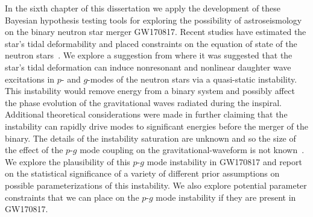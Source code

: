 In the sixth chapter of this dissertation we apply the development of these Bayesian hypothesis testing tools for exploring the possibility of astroseismology on the binary neutron star merger GW170817. Recent studies have estimated the star's tidal deformability and placed constraints on the equation of state of the neutron stars~\citep{TheLIGOScientific:2017qsa,Tews:2018iwm,Most:2018eaw,Raithel:2018ncd,de2018tidal,Abbott:2018exr,Abbott:2018wiz,Radice:2018ozg,LIGOScientific:2019eut,Capano:2019eae}. We explore a suggestion from \cite{Weinberg:2013pbi} where it was suggested that the star's tidal deformation can induce nonresonant and nonlinear daughter wave excitations in $p$- and $g$-modes of the neutron stars via a quasi-static instability. This instability would remove energy from a binary system and possibly affect the phase evolution of the gravitational waves radiated during the inspiral. Additional theoretical considerations were made in \cite{Weinberg:2015pxa} further claiming that the instability can rapidly drive modes to significant energies before the merger of the binary. The details of the instability saturation are unknown and so the size of the effect of the $p$-$g$ mode coupling on the gravitational-waveform is not known~\citep{Weinberg:2015pxa}. We explore the plausibility of this $p$-$g$ mode instability in GW170817 and report on the statistical significance of a variety of different prior assumptions on possible parameterizations of this instability. We also explore potential parameter constraints that we can place on the $p$-$g$ mode instability if they are present in GW170817. 
